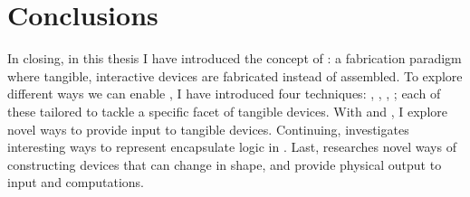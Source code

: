 \chapter{Conclusions} \label{ch:conclusion}
  In closing, in this thesis I have introduced the concept of \papf: a
  fabrication paradigm where tangible, interactive devices are fabricated
  instead of assembled. To explore different ways we can enable \papf, I have
  introduced four techniques: \at, \bh, \al, \mp; each of these tailored to
  tackle a specific facet of tangible devices. With \at and \bh, I explore novel
  ways to provide input to tangible devices. Continuing, \al investigates
  interesting ways to represent encapsulate logic in .
  Last, \mp researches novel ways of constructing devices that can change in
  shape, and provide physical output to input and computations.